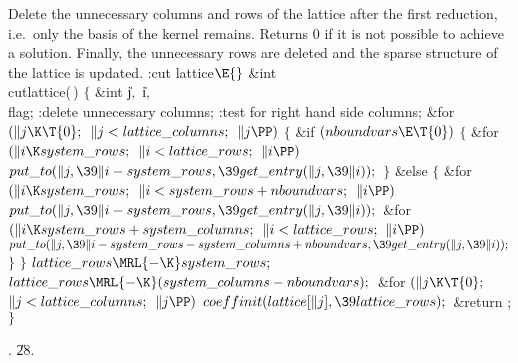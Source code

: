 Delete the unnecessary columns and rows of the lattice after
the first reduction, i.e.~only the basis of the kernel remains.
Returns $0$ if it is not possible to achieve a solution.
Finally, the unnecessary rows are deleted and the sparse structure of the
lattice is updated.
\Y\B\4:cut lattice\X${}\E{}$\6
\&{int} \\{cutlattice}(\,)\1\1\2\2\6
${}\{{}$\1\6
\&{int} \|j${},{}$ \|i${},{}$ \\{flag};\7
:delete unnecessary columns\X;\6
:test for right hand side columns\X;\6
\&{for} ${}(\|j\K\T{0};{}$ ${}\|j<\\{lattice\_columns};{}$ ${}\|j\PP){}$\5
${}\{{}$\1\6
\&{if} ${}(\\{nboundvars}\E\T{0}){}$\5
${}\{{}$\1\6
\&{for} ${}(\|i\K\\{system\_rows};{}$ ${}\|i<\\{lattice\_rows};{}$ ${}\|i%
\PP){}$\1\5
${}\\{put\_to}(\|j,\39\|i-\\{system\_rows},\39\\{get\_entry}(\|j,\39\|i));{}$\2%
\6
\4${}\}{}$\2\6
\&{else}\5
${}\{{}$\1\6
\&{for} ${}(\|i\K\\{system\_rows};{}$ ${}\|i<\\{system\_rows}+%
\\{nboundvars};{}$ ${}\|i\PP){}$\1\5
${}\\{put\_to}(\|j,\39\|i-\\{system\_rows},\39\\{get\_entry}(\|j,\39\|i));{}$\2%
\6
\&{for} ${}(\|i\K\\{system\_rows}+\\{system\_columns};{}$ ${}\|i<\\{lattice%
\_rows};{}$ ${}\|i\PP){}$\1\5
${}\\{put\_to}(\|j,\39\|i-\\{system\_rows}-\\{system\_columns}+\\{nboundvars},%
\39\\{get\_entry}(\|j,\39\|i));{}$\2\6
\4${}\}{}$\2\6
\4${}\}{}$\2\6
${}\\{lattice\_rows}\MRL{-{\K}}\\{system\_rows};{}$\6
${}\\{lattice\_rows}\MRL{-{\K}}(\\{system\_columns}-\\{nboundvars});{}$\6
\&{for} ${}(\|j\K\T{0};{}$ ${}\|j<\\{lattice\_columns};{}$ ${}\|j\PP){}$\1\5
${}\\{coeffinit}(\\{lattice}[\|j],\39\\{lattice\_rows});{}$\2\6
\&{return} ;\6
\4${}\}{}$\2\par
{}.
\U28.\fi

